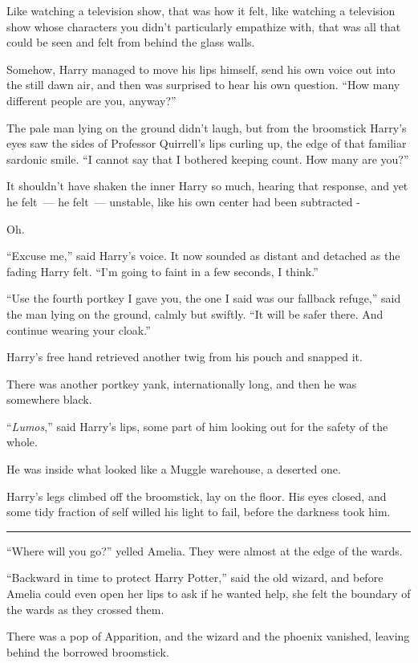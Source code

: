 Like watching a television show, that was how it felt, like watching a television show whose characters you didn't particularly empathize with, that was all that could be seen and felt from behind the glass walls.

Somehow, Harry managed to move his lips himself, send his own voice out into the still dawn air, and then was surprised to hear his own question. ``How many different people are you, anyway?''

The pale man lying on the ground didn't laugh, but from the broomstick Harry's eyes saw the sides of Professor Quirrell's lips curling up, the edge of that familiar sardonic smile. ``I cannot say that I bothered keeping count. How many are you?''

It shouldn't have shaken the inner Harry so much, hearing that response, and yet he felt~--- he felt~--- unstable, like his own center had been subtracted -

Oh.

``Excuse me,'' said Harry's voice. It now sounded as distant and detached as the fading Harry felt. ``I'm going to faint in a few seconds, I think.''

``Use the fourth portkey I gave you, the one I said was our fallback refuge,'' said the man lying on the ground, calmly but swiftly. ``It will be safer there. And continue wearing your cloak.''

Harry's free hand retrieved another twig from his pouch and snapped it.

There was another portkey yank, internationally long, and then he was somewhere black.

``\emph{Lumos},'' said Harry's lips, some part of him looking out for the safety of the whole.

He was inside what looked like a Muggle warehouse, a deserted one.

Harry's legs climbed off the broomstick, lay on the floor. His eyes closed, and some tidy fraction of self willed his light to fail, before the darkness took him.

\begin{center}\rule{3in}{0.4pt}\end{center}

``Where will you go?'' yelled Amelia. They were almost at the edge of the wards.

``Backward in time to protect Harry Potter,'' said the old wizard, and before Amelia could even open her lips to ask if he wanted help, she felt the boundary of the wards as they crossed them.

There was a pop of Apparition, and the wizard and the phoenix vanished, leaving behind the borrowed broomstick.
